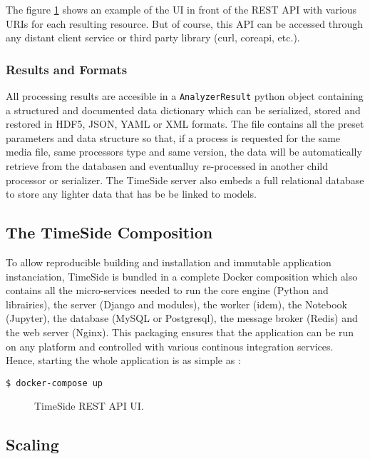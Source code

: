 \documentclass{article}
\begin{document}
The figure \ref{fig:TS2_API_UI} shows an example of the UI in front of the REST API with various URIs for each resulting resource. But of course, this API can be accessed through any distant client service or third party library (curl, coreapi, etc.).

\subsubsection{Results and Formats}

All processing results are accesible in a \verb|AnalyzerResult| python object containing a structured and documented data dictionary which can be serialized, stored and restored in HDF5, JSON, YAML or XML formats. The file contains all the preset parameters and data structure so that, if a process is requested for the same media file, same processors type and same version, the data will be automatically retrieve from the databasen and eventualluy re-processed in another child processor or serializer. The TimeSide server also embeds a full relational database to store any lighter data that has be be linked to models.

\subsection{The TimeSide Composition}

To allow reproducible building and installation and immutable application instanciation, TimeSide is bundled in a complete Docker composition which also contains all the micro-services needed to run the core engine (Python and librairies), the server (Django and modules), the worker (idem), the Notebook (Jupyter), the database (MySQL or Postgresql), the message broker (Redis) and the web server (Nginx). This packaging ensures that the application can be run on any platform and controlled with various continous integration services. Hence, starting the whole application is as simple as :\newline

\verb|$ docker-compose up|\newline


\begin{figure}
 \centerline{}
 \caption{TimeSide REST API UI.}
 \label{fig:TS2_API_UI}
\end{figure}

\subsection{Scaling}
\end{document}
